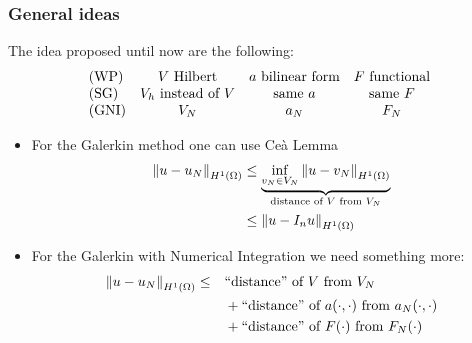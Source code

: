 \subsubsection*{General ideas}
The idea proposed until now are the following:
\[
    \begin{array}{lccc}
        \text{(WP)} & V \text{ Hilbert} & a \text{ bilinear form} & F \text{ functional} \\ 
        \text{(SG)} & V_h \text{ instead of } V & \text{same }a &  \text{same } F \\ 
        \text{(GNI)} & V_N & a_N  & F_N\\ 
    \end{array}
\]
\begin{itemize}
    \item For the Galerkin method one can use Ceà Lemma 
    \begin{align*}
        \norm{u-u_N}_{H^1(\Omega)} &\leq \underbrace{\inf_{v_N \in V_N}\norm{u-v_N}_{H^1(\Omega)}}_{\text{distance of } V \text{ from }V_N} \\
        &\leq \norm{u-I_nu}_{H^1(\Omega)}
    \end{align*}
    \item For the Galerkin with Numerical Integration we need something more:
    \begin{align*}
        \norm{u-u_N}_{H^1(\Omega)} \leq\quad & \text{``distance'' of } V \text{ from }V_N \\
        &+ \text{``distance'' of } a(\cdot,\cdot) \text{ from }a_N(\cdot,\cdot) \\
        &+ \text{``distance'' of } F(\cdot) \text{ from }F_N(\cdot)
    \end{align*}
\end{itemize}
